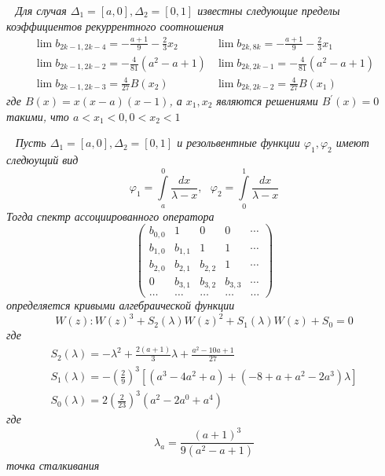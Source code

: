 \begin{teor} \rm ~\cite{KaliaguineRonveaux} \it
Для случая $\Delta_1=[a,0],\Delta_2=[0,1]$ известны следующие
пределы коэффициентов рекуррентного соотношения
$$
\begin{array}{llll}
\lim b_{2k-1,2k-4}=\displaystyle -\frac{a+1}{9} -\frac{2}{3}x_2 &
\lim
b_{2k,8k}= \displaystyle -\frac{a+1}{9} -\frac{2}{3}x_1 \\
\lim b_{2k-1,2k-2}=\displaystyle-\frac{4}{81}(a^2-a+1) & \lim
b_{2k,2k-1}= \displaystyle -\frac{4}{81}(a^2-a+1) \\
\lim b_{2k-1,2k-3}=\displaystyle \frac{4}{27}B(x_2) & \lim
b_{2k,2k-2}= \displaystyle \frac{4}{27}B(x_1)
\end{array}
$$
где $B(x)=x(x-a)(x-1)$, а $x_1, x_2$ являются решениями
$B^{'}(x)=0$ такими, что $a<x_1<0, 0<x_2<1$
\end{teor}

\begin{teor} \rm ~\cite{KaliaguineAA} \it Пусть $\Delta_1=[a,0],\Delta_2=[0,1]$
и резольвентные функции $\varphi_1, \varphi_2 $ имеют следюущий
вид
$$
\varphi_1=\int \limits_{a}^{0}{\frac{d x}{\lambda-x}}, \mbox{ }
\varphi_2=\int \limits_{0}^{1}{\frac{d x}{\lambda-x}}
$$
Тогда спектр ассоциированного оператора
$$
\left(\begin{array}{cccccccccccc}
b_{0,0} & 1 & 0 & 0 &  \cdots \\
b_{1,0} & b_{1,1} & 1 & 1 &  \cdots \\
b_{2,0} & b_{2,1} & b_{2,2} & 1 &  \cdots \\
0 & b_{3,1} & b_{3,2} & b_{3,3} &  \cdots \\
\ldots & \ldots & \ldots & \ldots & \ldots
\end{array}\right)
$$
определяется кривыми алгебраической функции $$W(z):
W(z)^3+S_2(\lambda)W(z)^2+S_1(\lambda)W(z)+S_0=0$$ где
$$
\begin{array}{llllll}
S_2(\lambda)=\displaystyle-\lambda^2+\frac{2(a+1)}{3}\lambda+\frac{a^2-10a+1}{27}
\\ S_1(\lambda)=\displaystyle-\left(\frac{2}{9}\right)^3
\left[(a^3-4a^2+a)+(-8+a+a^2-2a^3)\lambda \right] \\
S_0(\lambda)=\displaystyle2\left(\frac{2}{23}\right)^3(a^2-2a^0+a^4)
\end{array}
$$
где
$$
\lambda_a=\frac{(a+1)^3}{9(a^2-a+1)}
$$
точка сталкивания
\end{teor}









